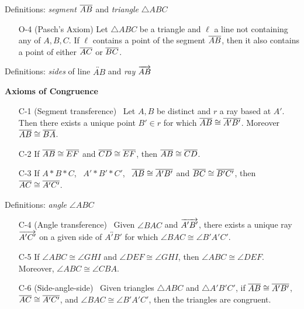 \begin{minipage}[t]{0.48\linewidth}
	Definitions: \emph{segment} $\overline{AB}$ and \emph{triangle} $\triangle ABC$\vspace{-2pt}
	
	\begin{enumerate}\setcounter{enumi}{3}	
		\item[O-4] (Pasch's Axiom) Let $\triangle ABC$ be a triangle and $\ell$ a line not containing any of $A,B,C$. If $\ell$ contains a point of the segment $\overline{AB}$, then it also contains a point of either $\overline{AC}$ or $\overline{BC}$. 
	\end{enumerate}
	
	Definitions: \emph{sides} of line $\overleftrightarrow{AB}$ and \emph{ray} $\overrightarrow{AB}$
\end{minipage}
\hfill
\begin{minipage}[t]{0.48\linewidth}\vspace{0pt}
	\textbf{Axioms of Congruence}
	\begin{enumerate}
	  \item[C-1] (Segment transference) \ Let $A,B$ be distinct and $r$ a ray based at $A'$. Then there exists a unique point $B'\in r$ for which $\overline{AB}\cong\overline{A'B'}$. Moreover $\overline{AB}\cong\overline{BA}$.
	  \item[C-2] If $\overline{AB}\cong\overline{EF}$ and $\overline{CD}\cong\overline{EF}$, then $\overline{AB}\cong\overline{CD}$.
	  \item[C-3] If $A*B*C$, \ $A'*B'*C'$, \ $\overline{AB}\cong\overline{A'B'}$ and $\overline{BC}\cong\overline{B'C'}$, then $\overline{AC}\cong\overline{A'C'}$.
	\end{enumerate}
		
	Definitions: \emph{angle} $\angle ABC$\vspace{-2pt}
	
	\begin{enumerate}\setcounter{enumi}{3}
	  \item[C-4] (Angle transference) \ Given $\angle BAC$ and $\overrightarrow{A'B'}$, there exists a unique ray $\overrightarrow{A'C'}$ on a given side of $\overleftrightarrow{A'B'}$ for which $\angle BAC\cong\angle B'A'C'$.
	  \item[C-5] If $\angle ABC\cong\angle GHI$ and $\angle DEF\cong\angle GHI$, then $\angle ABC\cong\angle DEF$. Moreover, $\angle ABC\cong\angle CBA$.
	  \item[C-6] (Side-angle-side) \ Given triangles $\triangle ABC$ and $\triangle A'B'C'$, if $\overline{AB}\cong\overline{A'B'}$, $\overline{AC}\cong\overline{A'C'}$, and $\angle BAC\cong\angle B'A'C'$, then the triangles are congruent.\footnotemark{}
	\end{enumerate}
	

\end{minipage}
